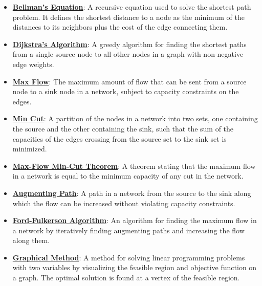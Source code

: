 \documentclass{article}%
\begin{document}
\begin{itemize}[leftmargin=*]
\item \href{https://www.math.purdue.edu/~yipn/421/2024-11-14-NetAppls.pdf#page=16}{\textbf{Bellman's Equation}}: A recursive equation used to solve the shortest path problem. It defines the shortest distance to a node as the minimum of the distances to its neighbors plus the cost of the edge connecting them.%
\item \href{https://www.math.purdue.edu/~yipn/421/2024-11-14-NetAppls.pdf#page=20}{\textbf{Dijkstra's Algorithm}}: A greedy algorithm for finding the shortest paths from a single source node to all other nodes in a graph with non-negative edge weights.%
\item \href{https://www.math.purdue.edu/~yipn/421/2024-11-19-MaxFlowMinCut.pdf#page=1}{\textbf{Max Flow}}: The maximum amount of flow that can be sent from a source node to a sink node in a network, subject to capacity constraints on the edges.%
\item \href{https://www.math.purdue.edu/~yipn/421/2024-11-19-MaxFlowMinCut.pdf#page=2}{\textbf{Min Cut}}: A partition of the nodes in a network into two sets, one containing the source and the other containing the sink, such that the sum of the capacities of the edges crossing from the source set to the sink set is minimized.%
\item \href{https://www.math.purdue.edu/~yipn/421/2024-11-19-MaxFlowMinCut.pdf#page=4}{\textbf{Max-Flow Min-Cut Theorem}}: A theorem stating that the maximum flow in a network is equal to the minimum capacity of any cut in the network.%
\item \href{https://www.math.purdue.edu/~yipn/421/2024-11-19-MaxFlowMinCut.pdf#page=10}{\textbf{Augmenting Path}}: A path in a network from the source to the sink along which the flow can be increased without violating capacity constraints.%
\item \href{https://www.math.purdue.edu/~yipn/421/2024-11-19-MaxFlowMinCut.pdf#page=10}{\textbf{Ford-Fulkerson Algorithm}}: An algorithm for finding the maximum flow in a network by iteratively finding augmenting paths and increasing the flow along them.%
\item \href{https://www.math.purdue.edu/~yipn/421/2024-12-03-Duality.pdf#page=3}{\textbf{Graphical Method}}: A method for solving linear programming problems with two variables by visualizing the feasible region and objective function on a graph. The optimal solution is found at a vertex of the feasible region.%
\end{itemize}
\end{document}
